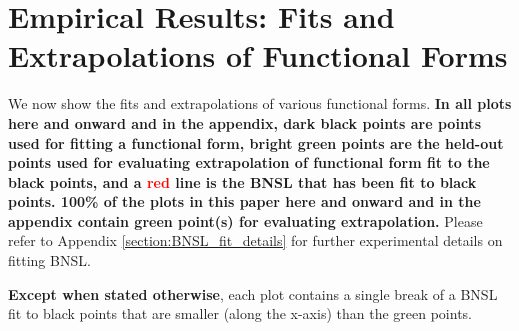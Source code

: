 \documentclass{article} %
\begin{document}




%
\section{Empirical Results: Fits and Extrapolations of Functional Forms}
\vspace{-3.85mm}
\label{section:functional_form_fits}

We now show the fits and extrapolations of various functional forms. \textbf{In all plots here and onward and in the appendix, dark black points are points used for fitting a functional form, bright \textcolor{Green3}{green} points are the held-out points used for evaluating extrapolation of functional form fit to the black points, and a \textcolor{red}{red} line is the BNSL that has been fit to black points. 100\% of the plots in this paper here and onward and in the appendix contain \textcolor{Green3}{green} point(s) for evaluating extrapolation.} Please refer to Appendix \ref{section:BNSL_fit_details} for further experimental details on fitting BNSL. 

\vspace{-1.6mm}

\textbf{Except when stated otherwise}, each plot contains a single break of a BNSL fit to black points that are smaller (along the x-axis) than the green points.

\vspace{-1.6mm}

\end{document}
